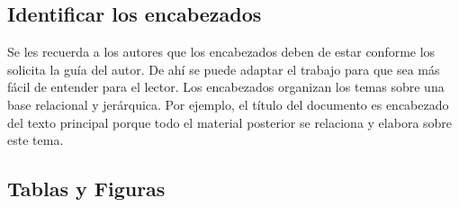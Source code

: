     \subsection{Identificar los encabezados}
    
    Se les recuerda a los autores que los encabezados deben de estar conforme los solicita la guía del autor. De ahí se puede adaptar el trabajo para que sea más fácil de entender para el lector.
    Los encabezados organizan los temas sobre una base relacional y jerárquica. Por ejemplo, el título del documento es encabezado del texto principal porque todo el material posterior se relaciona y elabora sobre este tema. 
    
    \subsection{Tablas y Figuras}
    
